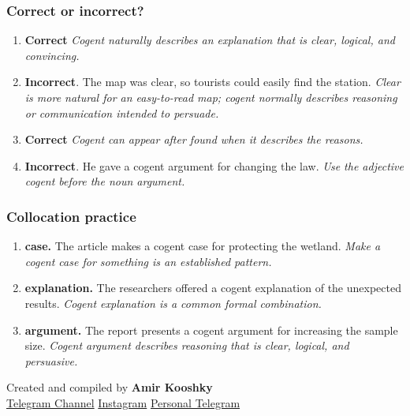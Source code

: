 \documentclass[11pt]{article}
\begin{document}
\subsubsection{Correct or incorrect?}
\begin{enumerate}
  \item \textbf{Correct} \emph{Cogent naturally describes an explanation that is clear, logical, and convincing.}
  \item \textbf{Incorrect}. The map was clear, so tourists could easily find the station. \emph{Clear is more natural for an easy-to-read map; cogent normally describes reasoning or communication intended to persuade.}
  \item \textbf{Correct} \emph{Cogent can appear after found when it describes the reasons.}
  \item \textbf{Incorrect}. He gave a cogent argument for changing the law. \emph{Use the adjective cogent before the noun argument.}
\end{enumerate}

\subsubsection{Collocation practice}
\begin{enumerate}
  \item \textbf{case.} The article makes a cogent case for protecting the wetland. \emph{Make a cogent case for something is an established pattern.}
  \item \textbf{explanation.} The researchers offered a cogent explanation of the unexpected results. \emph{Cogent explanation is a common formal combination.}
  \item \textbf{argument.} The report presents a cogent argument for increasing the sample size. \emph{Cogent argument describes reasoning that is clear, logical, and persuasive.}
\end{enumerate}

\vfill
\begin{center}
\small\color{Muted} Created and compiled by \textbf{Amir Kooshky}\\
\href{https://t.me/KooshkyTOEFL}{Telegram Channel}\quad\textbullet\quad
\href{https://www.instagram.com/kooshkytoefl}{Instagram}\quad\textbullet\quad
\href{https://t.me/KooshkyTOEFL\_pv}{Personal Telegram}
\end{center}
\end{document}
